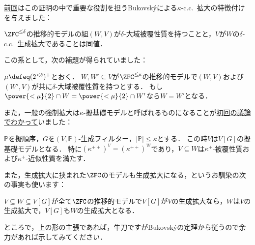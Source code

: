 \documentclass[a4j,leqno]{ltjsarticle}
\newcommand{\cc}{c.c.\ }
\begin{document}
\href{https://konn-san.com/math/geology-bukovsky-theorem.html}{前回}はこの証明の中で重要な役割を担うBukovsk\'{y}による$\kappa$-\cc{}拡大の特徴付けを与えました：
\begin{theorem}\label{thm:bukovsky}
 $\ZFC^{\leq \delta}$の推移的モデルの組$(W, V)$が$\delta$-大域被覆性質を持つことと，$V$が$W$の$\delta$-\cc{}生成拡大であることは同値．
\end{theorem}
この系として，次の補題が得られていました：
\begin{lemma}\label{lem:global-covering-unique}
 $\mu \defeq (2^{<\delta})^+$とおく．
 $W, W' \subseteq V$が$\ZFC^{\leq\mu}$の推移的モデルで$(W, V)$および$(W', V)$が共に$\delta$-大域被覆性質を持つとする．
 もし$\power{<\mu}{2} \cap W = \power{<\mu}{2} \cap W'$なら$W = W'$となる．
\end{lemma}
また，一般の強制拡大は$\kappa$-擬基礎モデルと呼ばれるものになることが\href{https://konn-san.com/math/geology-ground-definability.html\#lem:ground-is-pseudoground}{初回の議論でわかって}いました：
\begin{lemma}\label{lem:ground-is-pseudoground}
 $\mathbb{P}$を擬順序，$G$を$(V, \mathbb{P})$-生成フィルター，$|\mathbb{P}| \leq \kappa$とする．
 この時$V$は$V[G]$の擬基礎モデルとなる．
 特に$(\kappa^{++})^V = (\kappa^{++})^W$であり，$V \subseteq W$は$\kappa^+$-被覆性質および$\kappa^+$-近似性質を満たす．
\end{lemma}
また，生成拡大に挟まれた$\ZFC$のモデルも生成拡大になる，というお馴染の次の事実も使います：
\begin{fact}[中間拡大補題]\label{lem:interm-ext}
 $V \subseteq W \subseteq V[G]$が全て$\ZFC$の推移的モデルで$V[G]$が$V$の生成拡大なら，$W$は$V$の生成拡大で，$V[G]$も$W$の生成拡大となる．
\end{fact}
ところで，上の形の主張であれば，牛刀ですがBukovsk\'{y}の定理から従うので余力があれば示してみてください．
\end{document}

